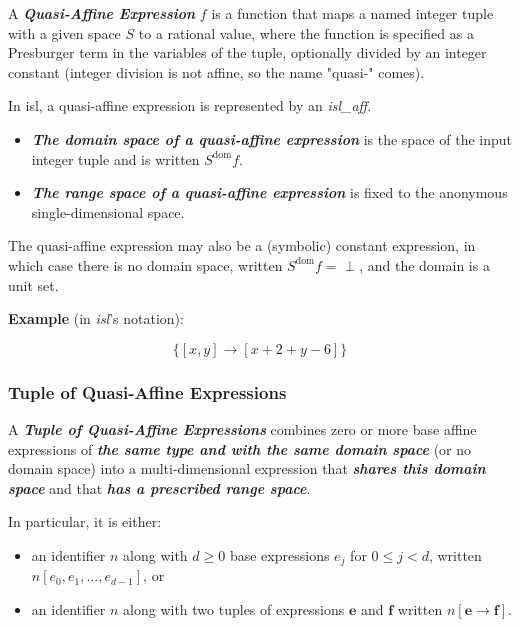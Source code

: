 A \textcolor{vr}{\textbf{\emph{Quasi-Affine Expression}}} $f$ is a function that maps a named integer tuple with a given space $S$ to a rational value, where the function is specified as a Presburger term in the variables of the tuple, optionally divided by an integer constant (integer division is not affine, so the name "quasi-" comes).

In isl, a quasi-affine expression is represented by an \textcolor{pg}{\emph{isl\_aff}}.

\begin{itemize}
  \item \textcolor{vr}{\textbf{\emph{The domain space of a quasi-affine expression}}} is the space of the input integer tuple and is written $S^{\text{dom}}f$.
  \item \textcolor{vr}{\textbf{\emph{The range space of a quasi-affine expression}}} is fixed to the anonymous single-dimensional  space.
\end{itemize}

The quasi-affine expression may also be a (symbolic) constant expression, in which case there is no domain space, written $S^{\text{dom}}f = \perp $, and the domain is a unit set.

\textbf{Example} (in \emph{isl}'s notation):

$$\{[x, y] \rightarrow [x + 2 + y - 6]\}$$

\subsubsection{Tuple of Quasi-Affine Expressions}

A \textcolor{vr}{\textbf{\emph{Tuple of Quasi-Affine Expressions}}} combines zero or more base affine expressions of \textbf{\textit{the same type and with the same domain space}} (or no domain space) into a multi-dimensional expression that \textbf{\textit{shares this domain space}} and that \textbf{\textit{has a prescribed range space}}.

In particular, it is either:

\begin{itemize}
  \item an identifier $n$ along with $d \ge 0$ base expressions $e_j$ for $0 \le j < d$, written $n[e_0 , e_1,...,e_{d-1}]$, or
  \item an identifier $n$ along with two tuples of expressions $\mathbf{e}$ and $\mathbf{f}$ written $n[\mathbf{e} \rightarrow \mathbf{f}]$.
\end{itemize}

